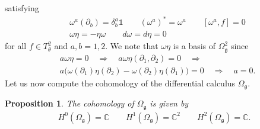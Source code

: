 \documentclass{amsart}
\newcommand{\complex}{\mathbb{C}}
\newcommand{\paraa}[1]{\big(#1\big)}
\newcommand{\spacearound}[1]{\quad#1\quad}
\renewcommand{\implies}{\spacearound{\Rightarrow}}
\newtheorem{proposition}[theorem]{Proposition}
\theoremstyle{definition}
\theoremstyle{remark}
\numberwithin{equation}{section}
\renewcommand{\mid}{\mathds{1}}
\renewcommand{\d}{\partial}
\newcommand{\g}{\mathfrak{g}}
\newcommand{\Omegag}[1]{\Omega^{#1}_{\g}}
\newcommand{\Ttwotheta}{T^2_{\theta}}
\begin{document}
satisfying
\begin{align*}
  &\omega^a(\d_b) = \delta^a_b\mid\qquad
    (\omega^a)^\ast = \omega^a\qquad [\omega^a,f] = 0\\
  &\omega\eta = -\eta\omega\qquad d\omega=d\eta = 0
\end{align*}
for all $f\in\Ttwotheta$ and $a,b=1,2$. We note that $\omega\eta$ is a basis of $\Omegag{2}$ since
\begin{align*}
  &a\omega\eta = 0\implies
  a\omega\eta(\d_1,\d_2) = 0\implies\\
  &a\paraa{\omega(\d_1)\eta(\d_2)-\omega(\d_2)\eta(\d_1)} = 0
  \implies a=0.
\end{align*}
Let us now compute the cohomology of the differential calculus $\Omegag{}$.

\begin{proposition}
  The cohomology of $\Omegag{}$ is given by
  \begin{align*}
    H^0(\Omegag{}) = \complex\qquad
    H^1(\Omegag{}) = \complex^2\qquad
    H^2(\Omegag{}) = \complex.
  \end{align*}
\end{proposition}
\end{document}
